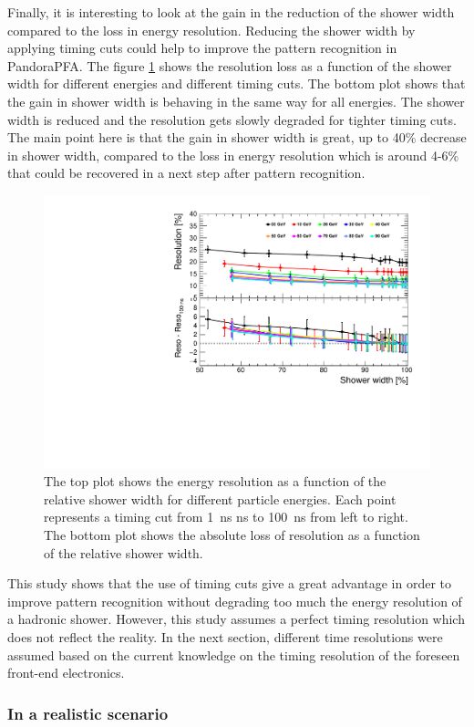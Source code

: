 Finally, it is interesting to look at the gain in the reduction of the shower width compared to the loss in energy resolution. Reducing the shower width by applying timing cuts could help to improve the pattern recognition in PandoraPFA. The figure \ref{fig:ShowerWidthResoNoSmearing} shows the resolution loss as a function of the shower width for different \kzeroL{} energies and different timing cuts. The bottom plot shows that the gain in shower width is behaving in the same way for all energies. The shower width is reduced and the resolution gets slowly degraded for tighter timing cuts. The main point here is that the gain in shower width is great, up to 40\% decrease in shower width, compared to the loss in energy resolution which is around 4-6\% that could be recovered in a next step after pattern recognition.

\begin{figure}[htbp!]
  \centering
  \includegraphics[width=0.6\linewidth]{../Thesis_Plots/ILD/NoSmearing/Plots/ShowerWidth_Resolution_noSmearing}
  \caption{The top plot shows the energy resolution as a function of the relative shower width for different particle energies. Each point represents a timing cut from \SI{1}{\nano\second} ns to \SI{100}{\nano\second} from left to right. The bottom plot shows the absolute loss of resolution as a function of the relative shower width.} \label{fig:ShowerWidthResoNoSmearing}
\end{figure}

This study shows that the use of timing cuts give a great advantage in order to improve pattern recognition without degrading too much the energy resolution of a hadronic shower. However, this study assumes a perfect timing resolution which does not reflect the reality. In the next section, different time resolutions were assumed based on the current knowledge on the timing resolution of the foreseen front-end electronics.

\subsubsection{In a realistic scenario}
\label{sec:RealisticScenario}

